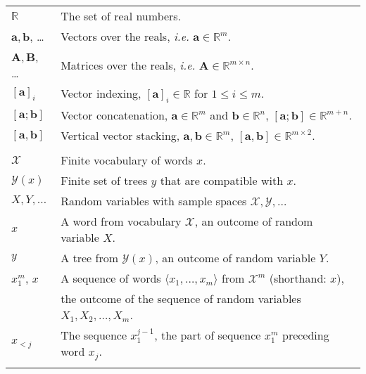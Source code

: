 \documentclass[11pt]{article}
\begin{document}
\begin{table}[h]
\center

  \begin{tabular}{l|l}
    \hline\hline
    $\mathbb{R}$  & The set of real numbers.   \\
    $\mathbf{a}, \mathbf{b}$, \dots  & Vectors over the reals, \textit{i.e.} $\mathbf{a} \in \mathbb{R}^m$.  \\
    $\mathbf{A}, \mathbf{B}$, \dots & Matrices over the reals, \textit{i.e.} $\mathbf{A} \in \mathbb{R}^{m \times n}$.   \\
    $[\mathbf{a}]_i$ & Vector indexing, $[\mathbf{a}]_i \in \mathbb{R}$ for $1 \leq i \leq m$. \\
    $[\mathbf{a}; \mathbf{b}]$ & Vector concatenation, $\mathbf{a} \in \mathbb{R}^{m}$ and $\mathbf{b} \in \mathbb{R}^{n}$, $[\mathbf{a}; \mathbf{b}] \in \mathbb{R}^{m+n}$.  \\
    $[\mathbf{a}, \mathbf{b}]$  & Vertical vector stacking, $\mathbf{a}, \mathbf{b} \in \mathbb{R}^{m}$, $[\mathbf{a}, \mathbf{b}] \in \mathbb{R}^{m \times 2}$.  \\
    & \\

    $\mathcal{X}$ & Finite vocabulary of words $x$. \\
    $\mathcal{Y}(x)$ & Finite set of trees $y$ that are compatible with $x$.  \\
    $X, Y, \dots$ & Random variables with sample spaces $\mathcal{X}, \mathcal{Y}, \dots$  \\
    $x$ & A word from vocabulary $\mathcal{X}$, an outcome of random variable $X$.   \\
    $y$ & A tree from $\mathcal{Y}(x)$, an outcome of random variable $Y$.  \\
    $x_1^m$, $x$ & A sequence of words $\langle x_1, \dots, x_m \rangle$ from $\mathcal{X}^m$ (shorthand: $x$), \\ & the outcome of the sequence of random variables $X_1, X_2, \dots, X_m$.   \\
    $x_{<j}$ & The sequence $x_{1}^{j-1}$, the part of sequence $x_1^m$ preceding word $x_j$.  \\
    & \\



\end{tabular}
\end{table}
\end{document}
